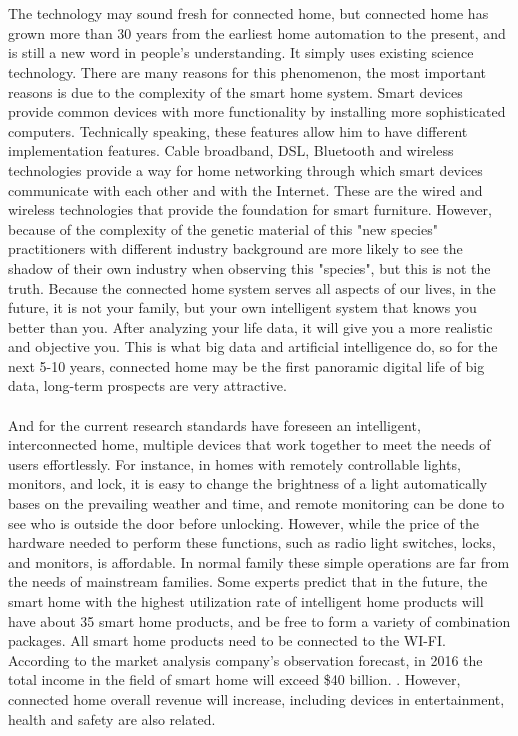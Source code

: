 \documentclass[report]{IEEEtran}
\begin{document}
\\\\The technology may sound fresh for connected home, but connected home has grown more than 30 years from the earliest home automation to the present, and is still a new word in people's understanding. It simply uses existing science technology. There are many reasons for this phenomenon, the most important reasons is due to the complexity of the smart home system. Smart devices provide common devices with more functionality by installing more sophisticated computers. Technically speaking, these features allow him to have different implementation features. Cable broadband, DSL, Bluetooth and wireless technologies provide a way for home networking through which smart devices communicate with each other and with the Internet. These are the wired and wireless technologies that provide the foundation for smart furniture. However, because of the complexity of the genetic material of this "new species" practitioners with different industry background are more likely to see the shadow of their own industry when observing this "species", but this is not the truth. Because the connected home system serves all aspects of our lives, in the future, it is not your family, but your own intelligent system that knows you better than you. After analyzing your life data, it will give you a more realistic and objective you. This is what big data and artificial intelligence do, so for the next 5-10 years, connected home may be the first panoramic digital life of big data, long-term prospects are very attractive.
\\\\ And for the current research standards have foreseen an intelligent, interconnected home, multiple devices that work together to meet the needs of users effortlessly. For instance, in homes with remotely controllable lights, monitors, and lock, it is easy to change the brightness of a light automatically bases on the prevailing weather and time, and remote monitoring can be done to see who is outside the door before unlocking. However, while the price of the hardware needed to perform these functions, such as radio light switches, locks, and monitors, is affordable. In normal family these simple operations are far from the needs of mainstream families. Some experts predict that in the future, the smart home with the highest utilization rate of intelligent home products will have about 35 smart home products, and be free to form a variety of combination packages. All smart home products need to be connected to the WI-FI. According to the market analysis company's observation forecast, in 2016 the total income in the field of smart home will exceed \$40 billion. \cite{3}.  However, connected home overall revenue will increase, including devices in entertainment, health and safety are also related.
 
\end{document}
